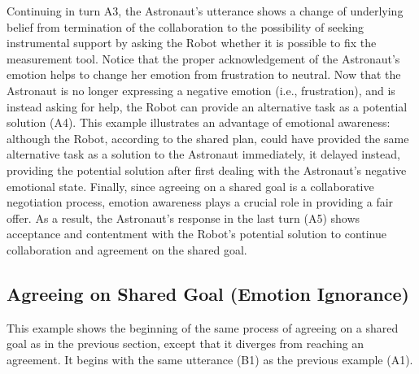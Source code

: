 Continuing in turn A3, the Astronaut's utterance shows a change of underlying
belief from termination of the collaboration to the possibility of seeking
instrumental support by asking the Robot whether it is possible to fix the
measurement tool. Notice that the proper acknowledgement of the Astronaut's
emotion helps to change her emotion from frustration to neutral. Now that the
Astronaut is no longer expressing a negative emotion (i.e., frustration), and is
instead asking for help, the Robot can provide an alternative task as a
potential solution (A4). This example illustrates an advantage of
emotional awareness: although the Robot, according to the shared plan, could
have provided the same alternative task as a solution to the Astronaut
immediately, it delayed instead, providing the potential solution after first
dealing with the Astronaut's negative emotional state. Finally, since agreeing
on a shared goal is a collaborative negotiation process, emotion awareness plays
a crucial role in providing a fair offer. As a result, the Astronaut's response
in the last turn (A5) shows acceptance and contentment with the Robot's
potential solution to continue collaboration and agreement on the shared goal.

\subsection{Agreeing on Shared Goal (Emotion Ignorance)}
\label{sec:exp2}

This example shows the beginning of the same process of agreeing on a shared
goal as in the previous section, except that it diverges from reaching an
agreement. It begins with the same utterance (B1) as the previous example (A1).

